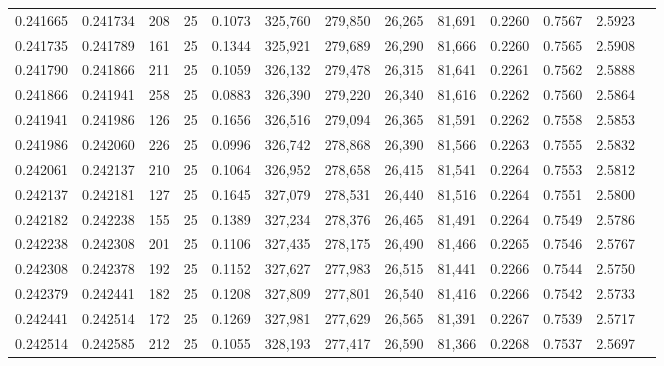 \begin{tabular}{rrrrrrrrrrrrr}
0.241665 & 0.241734 &   208 &  25 &                                     0.1073 & 325,760 & 279,850 &  26,265 &  81,691 & 0.2260 & 0.7567 & 2.5923 \\
0.241735 & 0.241789 &   161 &  25 &                                     0.1344 & 325,921 & 279,689 &  26,290 &  81,666 & 0.2260 & 0.7565 & 2.5908 \\
0.241790 & 0.241866 &   211 &  25 &                                     0.1059 & 326,132 & 279,478 &  26,315 &  81,641 & 0.2261 & 0.7562 & 2.5888 \\
0.241866 & 0.241941 &   258 &  25 &                                     0.0883 & 326,390 & 279,220 &  26,340 &  81,616 & 0.2262 & 0.7560 & 2.5864 \\
0.241941 & 0.241986 &   126 &  25 &                                     0.1656 & 326,516 & 279,094 &  26,365 &  81,591 & 0.2262 & 0.7558 & 2.5853 \\
0.241986 & 0.242060 &   226 &  25 &                                     0.0996 & 326,742 & 278,868 &  26,390 &  81,566 & 0.2263 & 0.7555 & 2.5832 \\
0.242061 & 0.242137 &   210 &  25 &                                     0.1064 & 326,952 & 278,658 &  26,415 &  81,541 & 0.2264 & 0.7553 & 2.5812 \\
0.242137 & 0.242181 &   127 &  25 &                                     0.1645 & 327,079 & 278,531 &  26,440 &  81,516 & 0.2264 & 0.7551 & 2.5800 \\
0.242182 & 0.242238 &   155 &  25 &                                     0.1389 & 327,234 & 278,376 &  26,465 &  81,491 & 0.2264 & 0.7549 & 2.5786 \\
0.242238 & 0.242308 &   201 &  25 &                                     0.1106 & 327,435 & 278,175 &  26,490 &  81,466 & 0.2265 & 0.7546 & 2.5767 \\
0.242308 & 0.242378 &   192 &  25 &                                     0.1152 & 327,627 & 277,983 &  26,515 &  81,441 & 0.2266 & 0.7544 & 2.5750 \\
0.242379 & 0.242441 &   182 &  25 &                                     0.1208 & 327,809 & 277,801 &  26,540 &  81,416 & 0.2266 & 0.7542 & 2.5733 \\
0.242441 & 0.242514 &   172 &  25 &                                     0.1269 & 327,981 & 277,629 &  26,565 &  81,391 & 0.2267 & 0.7539 & 2.5717 \\
0.242514 & 0.242585 &   212 &  25 &                                     0.1055 & 328,193 & 277,417 &  26,590 &  81,366 & 0.2268 & 0.7537 & 2.5697 \\

\end{tabular}
